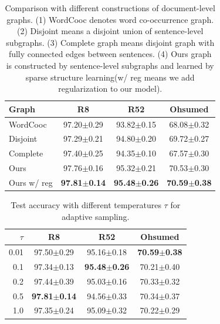 \documentclass[letterpaper]{article} %
\begin{document}
\begin{table}[t]
\centering
\begin{tabular}{l|ccc}
\toprule
\textbf{Graph} & \textbf{R8} & \textbf{R52} & \textbf{Ohsumed} \\ \midrule
WordCooc & 97.20$\pm$0.29 & 93.82$\pm$0.15 & 68.08$\pm$0.32 \\
Disjoint & 97.29$\pm$0.21 & 94.80$\pm$0.20 & 69.72$\pm$0.27 \\
Complete & 97.40$\pm$0.25 & 94.35$\pm$0.10 & 67.57$\pm$0.30 \\
\midrule
Ours      & 97.76$\pm$0.16 & 95.32$\pm$0.21 & 70.53$\pm$0.30\\
Ours w/ reg & \textbf{97.81$\pm$0.14} & \textbf{95.48$\pm$0.26} & \textbf{70.59$\pm$0.38}\\
\bottomrule
\end{tabular}
\caption{Comparison with different constructions of document-level graphs. (1) WordCooc denotes word co-occurrence graph. (2) Disjoint means a disjoint union of sentence-level subgraphs. (3) Complete graph means disjoint graph with fully connected edges between sentences. (4) Ours graph is constructed by sentence-level subgraphs and learned by sparse structure learning(w/ reg means we add regularization to our model). } 
\label{table3}
\end{table}



\begin{table}[t]
\centering
\begin{tabular}{r|ccc}
\toprule
\textbf{$\tau$} & \textbf{R8} & \textbf{R52} & \textbf{Ohsumed} \\ \midrule
0.01 & 97.50$\pm$0.29 & 95.16$\pm$0.18 & \textbf{70.59$\pm$0.38} \\
0.1  & 97.34$\pm$0.13 & \textbf{95.48$\pm$0.26} & 70.21$\pm$0.40 \\
0.2  & 97.44$\pm$0.39 & 95.03$\pm$0.16 & 70.33$\pm$0.32  \\
0.5  &\textbf{97.81$\pm$0.14} & 94.56$\pm$0.33 & 70.34$\pm$0.37 \\
1.0  & 97.35$\pm$0.24 & 95.09$\pm$0.32 & 70.22$\pm$0.29 \\
\bottomrule
\end{tabular}
\caption{Test accuracy with different temperatures $\tau$ for adaptive sampling.}
\label{table4}
\end{table}
\end{document}
